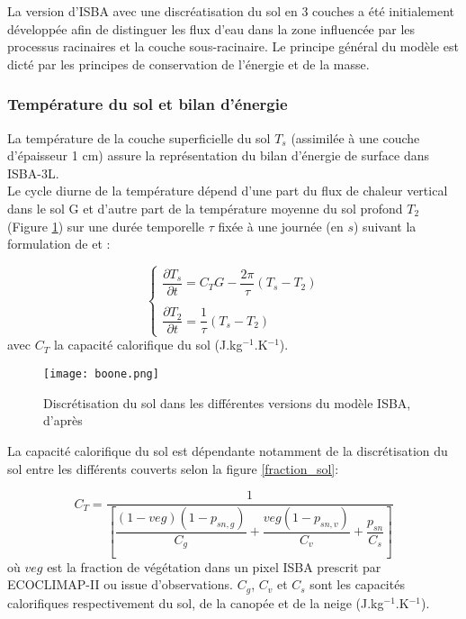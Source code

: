 La version d'ISBA avec une discréatisation du sol en 3 couches a été initialement développée afin de distinguer les flux d'eau dans la zone influencée par les processus racinaires et la couche sous-racinaire. Le principe général du modèle est dicté par les principes de conservation de l'énergie et de la masse. 

\subsubsection{{\selectfont Température du sol et bilan d'énergie}}
\label{subsubsec:energie}
La température de la couche superficielle du sol $T_s$ (assimilée à une couche d'épaisseur 1 cm) assure la représentation du bilan d'énergie de surface dans ISBA-3L.\\

\noindent Le cycle diurne de la température dépend d'une part du flux de chaleur vertical dans le sol G et d'autre part de la température moyenne du sol profond $T_{2}$ (Figure \ref{boone}) sur une durée temporelle $\tau$ fixée à une journée (en $s$) suivant la formulation de \citet{bhumralkar1975} et \citet{blackadar1976}:

\begin{equation}
\begin{cases}
\label{eq_t_surf_3L}
\dfrac{\partial T_{s}}{\partial t} = C_{T}G - \dfrac{2\pi}{\tau}(T_{s}-T_{2})\\

\\

\dfrac{\partial T_{2}}{\partial t} =\dfrac{1}{\tau}(T_{s}-T_{2})
\end{cases}
\end{equation}
avec $C_{T}$ la capacité calorifique du sol (J.kg$^{-1}$.K$^{-1}$).\\

\begin{figure}[h!]
  \texttt{[image: boone.png]}
  \caption{Discrétisation du sol dans les différentes versions du modèle ISBA, d'après \citet{boone2000}}
  \label{boone}
\end{figure}

\noindent La capacité calorifique du sol est dépendante notamment de la discrétisation du sol entre les différents couverts selon la figure \ref{fraction_sol}:

\begin{equation}
C_{T} = \dfrac{1}{\left[\dfrac{(1-veg)(1-p_{sn,g})}{C_{g}}+\dfrac{veg(1-p_{sn,v})}{C_{v}}+\dfrac{p_{sn}}{C_{s}}\right]}
\end{equation}
où $veg$ est la fraction de végétation dans un pixel ISBA prescrit par ECOCLIMAP-II ou issue d'observations. $C_{g}$, $C_{v}$ et $C_{s}$ sont les capacités calorifiques respectivement du sol, de la canopée et de la neige (J.kg$^{-1}$.K$^{-1}$). \\

